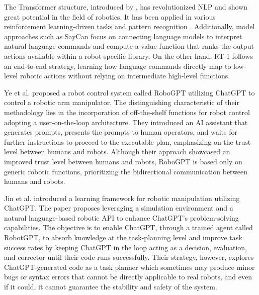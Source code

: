 The Transformer structure, introduced by \cite{vaswani2017attention}, has revolutionized NLP and shown great potential in the field of robotics. It has been applied in various reinforcement learning-driven tasks \cite{chen2021decision, janner2021offline} and pattern recognition \cite{he2022masked}. Additionally, model approaches such as SayCan \cite{brohan2023can} focus on connecting language models to interpret natural language commands and compute a value function that ranks the output actions available within a robot-specific library. On the other hand, RT-1 \cite{brohan2022rt} follows an end-to-end strategy, learning how language commands directly map to low-level robotic actions without relying on intermediate high-level functions.

Ye et al. \cite{ye2023improved} proposed a robot control system called RoboGPT utilizing ChatGPT \cite{ChatGPT} to control a robotic arm manipulator. The distinguishing characteristic of their methodology lies in the incorporation of off-the-shelf functions for robot control adopting a user-on-the-loop architecture. They introduced an AI assistant that generates prompts, presents the prompts to human operators, and waits for further instructions to proceed to the executable plan, emphasizing on the trust level between humans and robots. Although their approach showcased an improved trust level between humans and robots, RoboGPT is based only on generic robotic functions, prioritizing the bidirectional communication between humans and robots.

Jin et al. \cite{jin2024robotgpt} introduced a learning framework for robotic manipulation utilizing ChatGPT. The paper proposes leveraging a simulation environment and a natural language-based robotic API to enhance ChatGPT's problem-solving capabilities. The objective is to enable ChatGPT, through a trained agent called RobotGPT, to absorb knowledge at the task-planning level and improve task success rates by keeping ChatGPT in the loop acting as a decision, evaluation, and corrector until their code runs successfully. Their strategy, however, explores ChatGPT-generated code as a task planner which sometimes may produce minor bugs or syntax errors that cannot be directly applicable to real robots, and even if it could, it cannot guarantee the stability and safety of the system.


